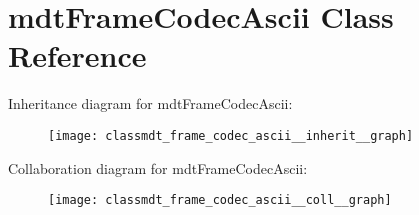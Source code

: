 \hypertarget{classmdt_frame_codec_ascii}{
\section{mdtFrameCodecAscii Class Reference}
\label{classmdt_frame_codec_ascii}
}


Inheritance diagram for mdtFrameCodecAscii:\nopagebreak
\begin{figure}[H]
\begin{center}
\leavevmode
\texttt{[image: classmdt\_frame\_codec\_ascii\_\_inherit\_\_graph]}
\end{center}
\end{figure}


Collaboration diagram for mdtFrameCodecAscii:\nopagebreak
\begin{figure}[H]
\begin{center}
\leavevmode
\texttt{[image: classmdt\_frame\_codec\_ascii\_\_coll\_\_graph]}
\end{center}
\end{figure}
